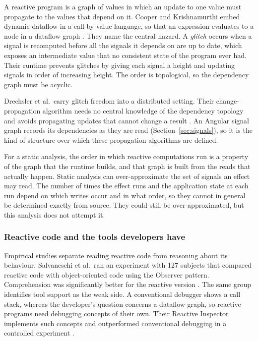 A reactive program is a graph of values in which an update to one value must propagate to the
values that depend on it. Cooper and Krishnamurthi embed dynamic dataflow in a call-by-value
language, so that an expression evaluates to a node in a dataflow graph
\cite{cooper2006embedding}. They name the central hazard. A \emph{glitch} occurs when a signal is
recomputed before all the signals it depends on are up to date, which exposes an intermediate
value that no consistent state of the program ever had. Their runtime prevents glitches by giving
each signal a height and updating signals in order of increasing height. The order is
topological, so the dependency graph must be acyclic.

Drechsler et al.\ carry glitch freedom into a distributed setting. Their change-propagation
algorithm needs no central knowledge of the dependency topology and avoids propagating updates
that cannot change a result \cite{drechsler2014distributed}. An Angular signal graph records its
dependencies as they are read (Section~\ref{sec:signals}), so it is the kind of structure over
which these propagation algorithms are defined.

For a static analysis, the order in which reactive computations run is a property of the graph
that the runtime builds, and that graph is built from the reads that actually happen. Static
analysis can over-approximate the set of signals an effect may read. The number of times the
effect runs and the application state at each run depend on which writes occur and in what
order, so they cannot in general be determined exactly from source. They could still be
over-approximated, but this analysis does not attempt it.

\subsubsection{Reactive code and the tools developers have}

Empirical studies separate reading reactive code from reasoning about its behaviour. Salvaneschi
et al.\ ran an experiment with 127 subjects that compared reactive code with object-oriented code
using the Observer pattern. Comprehension was significantly better for the reactive version
\cite{salvaneschi2017positive}. The same group identifies tool support as the weak side. A
conventional debugger shows a call stack, whereas the developer's question concerns a dataflow
graph, so reactive programs need debugging concepts of their own. Their Reactive Inspector
implements such concepts and outperformed conventional debugging in a controlled experiment
\cite{salvaneschi2016debugging}.

